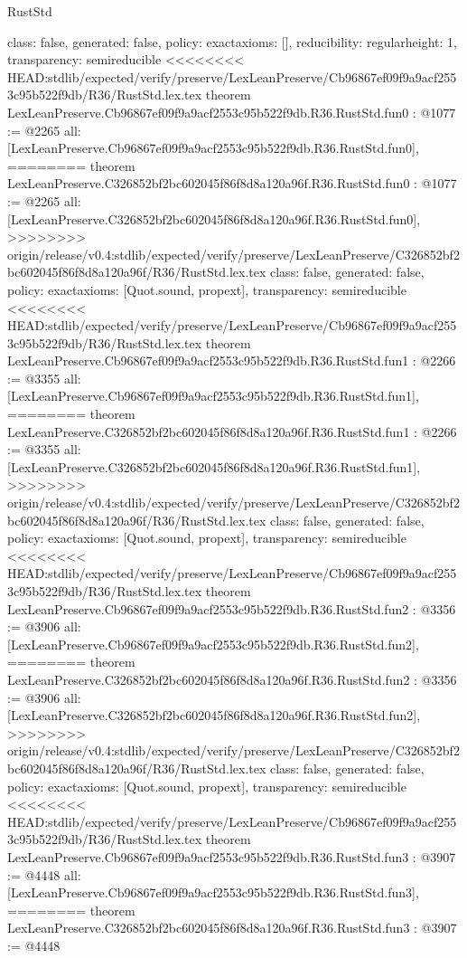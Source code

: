 \begin{lexlean}{RustStd}
\begin{coremodule}
{\begin{coremodule}
{{{  class: false,
  generated: false,
  policy: exact{axioms: []},
  reducibility: regular{height: 1},
  transparency: semireducible
}
<<<<<<<< HEAD:stdlib/expected/verify/preserve/LexLeanPreserve/Cb96867ef09f9a9acf2553c95b522f9db/R36/RustStd.lex.tex
theorem LexLeanPreserve.Cb96867ef09f9a9acf2553c95b522f9db.R36.RustStd.fun0 : @1077 := @2265 {
  all: [LexLeanPreserve.Cb96867ef09f9a9acf2553c95b522f9db.R36.RustStd.fun0],
========
theorem LexLeanPreserve.C326852bf2bc602045f86f8d8a120a96f.R36.RustStd.fun0 : @1077 := @2265 {
  all: [LexLeanPreserve.C326852bf2bc602045f86f8d8a120a96f.R36.RustStd.fun0],
>>>>>>>> origin/release/v0.4:stdlib/expected/verify/preserve/LexLeanPreserve/C326852bf2bc602045f86f8d8a120a96f/R36/RustStd.lex.tex
  class: false,
  generated: false,
  policy: exact{axioms: [Quot.sound, propext]},
  transparency: semireducible
}
<<<<<<<< HEAD:stdlib/expected/verify/preserve/LexLeanPreserve/Cb96867ef09f9a9acf2553c95b522f9db/R36/RustStd.lex.tex
theorem LexLeanPreserve.Cb96867ef09f9a9acf2553c95b522f9db.R36.RustStd.fun1 : @2266 := @3355 {
  all: [LexLeanPreserve.Cb96867ef09f9a9acf2553c95b522f9db.R36.RustStd.fun1],
========
theorem LexLeanPreserve.C326852bf2bc602045f86f8d8a120a96f.R36.RustStd.fun1 : @2266 := @3355 {
  all: [LexLeanPreserve.C326852bf2bc602045f86f8d8a120a96f.R36.RustStd.fun1],
>>>>>>>> origin/release/v0.4:stdlib/expected/verify/preserve/LexLeanPreserve/C326852bf2bc602045f86f8d8a120a96f/R36/RustStd.lex.tex
  class: false,
  generated: false,
  policy: exact{axioms: [Quot.sound, propext]},
  transparency: semireducible
}
<<<<<<<< HEAD:stdlib/expected/verify/preserve/LexLeanPreserve/Cb96867ef09f9a9acf2553c95b522f9db/R36/RustStd.lex.tex
theorem LexLeanPreserve.Cb96867ef09f9a9acf2553c95b522f9db.R36.RustStd.fun2 : @3356 := @3906 {
  all: [LexLeanPreserve.Cb96867ef09f9a9acf2553c95b522f9db.R36.RustStd.fun2],
========
theorem LexLeanPreserve.C326852bf2bc602045f86f8d8a120a96f.R36.RustStd.fun2 : @3356 := @3906 {
  all: [LexLeanPreserve.C326852bf2bc602045f86f8d8a120a96f.R36.RustStd.fun2],
>>>>>>>> origin/release/v0.4:stdlib/expected/verify/preserve/LexLeanPreserve/C326852bf2bc602045f86f8d8a120a96f/R36/RustStd.lex.tex
  class: false,
  generated: false,
  policy: exact{axioms: [Quot.sound, propext]},
  transparency: semireducible
}
<<<<<<<< HEAD:stdlib/expected/verify/preserve/LexLeanPreserve/Cb96867ef09f9a9acf2553c95b522f9db/R36/RustStd.lex.tex
theorem LexLeanPreserve.Cb96867ef09f9a9acf2553c95b522f9db.R36.RustStd.fun3 : @3907 := @4448 {
  all: [LexLeanPreserve.Cb96867ef09f9a9acf2553c95b522f9db.R36.RustStd.fun3],
========
theorem LexLeanPreserve.C326852bf2bc602045f86f8d8a120a96f.R36.RustStd.fun3 : @3907 := @4448 {
}}}}}}}
\end{coremodule}}
\end{coremodule}
\end{lexlean}
